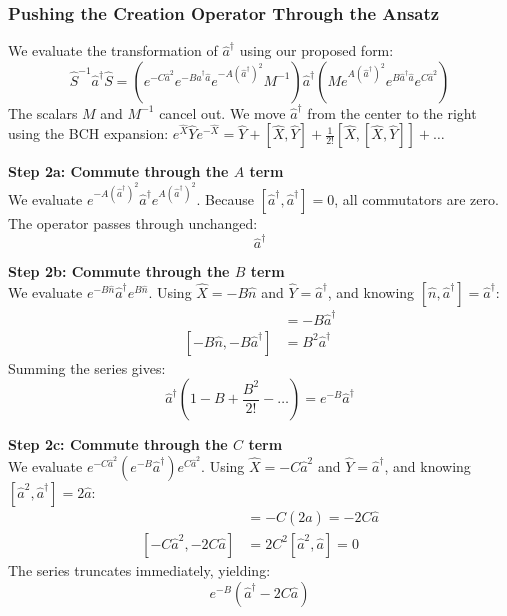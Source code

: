 \subsubsection{Pushing the Creation Operator Through the Ansatz}
We evaluate the transformation of $\hat{a}^\dagger$ using our proposed form:
\begin{equation*}
\hat{S}^{-1} \hat{a}^\dagger \hat{S} = \left(e^{-C\hat{a}^2} e^{-B\hat{a}^\dagger\hat{a}} e^{-A(\hat{a}^\dagger)^2} M^{-1}\right) \hat{a}^\dagger \left(M e^{A(\hat{a}^\dagger)^2} e^{B\hat{a}^\dagger\hat{a}} e^{C\hat{a}^2}\right)
\end{equation*}
The scalars $M$ and $M^{-1}$ cancel out. We move $\hat{a}^\dagger$ from the center to the right using the BCH expansion: $e^{\hat{X}}\hat{Y}e^{-\hat{X}} = \hat{Y} + [\hat{X},\hat{Y}] + \frac{1}{2!}[\hat{X},[\hat{X},\hat{Y}]] + \dots$

\textbf{Step 2a: Commute through the $A$ term} \\
We evaluate $e^{-A(\hat{a}^\dagger)^2} \hat{a}^\dagger e^{A(\hat{a}^\dagger)^2}$. Because $[\hat{a}^\dagger, \hat{a}^\dagger] = 0$, all commutators are zero. The operator passes through unchanged:
\begin{equation*}
\hat{a}^\dagger
\end{equation*}

\textbf{Step 2b: Commute through the $B$ term} \\
We evaluate $e^{-B\hat{n}} \hat{a}^\dagger e^{B\hat{n}}$. Using $\hat{X} = -B\hat{n}$ and $\hat{Y} = \hat{a}^\dagger$, and knowing $[\hat{n}, \hat{a}^\dagger] = \hat{a}^\dagger$:
\begin{align*}
[-B\hat{n}, \hat{a}^\dagger] &= -B\hat{a}^\dagger \\
[-B\hat{n}, -B\hat{a}^\dagger] &= B^2\hat{a}^\dagger
\end{align*}
Summing the series gives:
\begin{equation*}
\hat{a}^\dagger\left(1 - B + \frac{B^2}{2!} - \dots\right) = e^{-B}\hat{a}^\dagger
\end{equation*}

\textbf{Step 2c: Commute through the $C$ term} \\
We evaluate $e^{-C\hat{a}^2} (e^{-B}\hat{a}^\dagger) e^{C\hat{a}^2}$. Using $\hat{X} = -C\hat{a}^2$ and $\hat{Y} = \hat{a}^\dagger$, and knowing $[\hat{a}^2, \hat{a}^\dagger] = 2\hat{a}$:
\begin{align*}
[-C\hat{a}^2, \hat{a}^\dagger] &= -C(2\hat{a}) = -2C\hat{a} \\
[-C\hat{a}^2, -2C\hat{a}] &= 2C^2[\hat{a}^2, \hat{a}] = 0
\end{align*}
The series truncates immediately, yielding:
\begin{equation*}
e^{-B}(\hat{a}^\dagger - 2C\hat{a})
\end{equation*}

